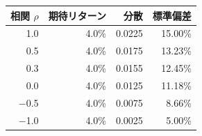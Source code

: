 \begin{tabular}{rrrr}
\toprule
相関 $\rho$ & 期待リターン & 分散 & 標準偏差 \\
\midrule
1.0 & 4.0\% & 0.0225 & 15.00\% \\
0.5 & 4.0\% & 0.0175 & 13.23\% \\
0.3 & 4.0\% & 0.0155 & 12.45\% \\
0.0 & 4.0\% & 0.0125 & 11.18\% \\
\ensuremath{-}0.5 & 4.0\% & 0.0075 & 8.66\% \\
\ensuremath{-}1.0 & 4.0\% & 0.0025 & 5.00\% \\
\bottomrule
\end{tabular}
